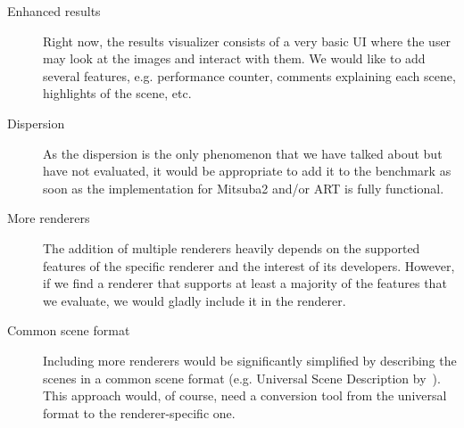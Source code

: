 \begin{description}
	\item[Enhanced results] Right now, the results visualizer consists of a very basic UI where the user may look at the images and interact with them. We would like to add several features, e.g. performance counter, comments explaining each scene, highlights of the scene, etc.
	\item[Dispersion] As the dispersion is the only phenomenon that we have talked about but have not evaluated, it would be appropriate to add it to the benchmark as soon as the implementation for Mitsuba2 and/or ART is fully functional.
	\item[More renderers] The addition of multiple renderers heavily depends on the supported features of the specific renderer and the interest of its developers. However, if we find a renderer that supports at least a majority of the features that we evaluate, we would gladly include it in the renderer.
	\item[Common scene format] Including more renderers would be significantly simplified by describing the scenes in a common scene format (e.g. Universal Scene Description by~\citet{usdDoc}). This approach would, of course, need a conversion tool from the universal format to the renderer-specific one.
\end{description}